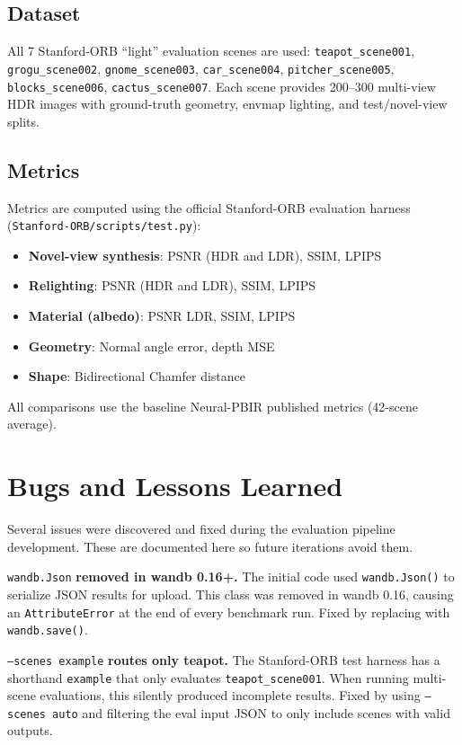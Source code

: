 \subsection{Dataset}

All 7 Stanford-ORB ``light'' evaluation scenes are used:
\texttt{teapot\_scene001}, \texttt{grogu\_scene002}, \texttt{gnome\_scene003},
\texttt{car\_scene004}, \texttt{pitcher\_scene005}, \texttt{blocks\_scene006},
\texttt{cactus\_scene007}. Each scene provides 200--300 multi-view HDR images
with ground-truth geometry, envmap lighting, and test/novel-view splits.

\subsection{Metrics}

Metrics are computed using the official Stanford-ORB evaluation harness
(\texttt{Stanford-ORB/scripts/test.py}):

\begin{itemize}
    \item \textbf{Novel-view synthesis}: PSNR (HDR and LDR), SSIM, LPIPS
    \item \textbf{Relighting}: PSNR (HDR and LDR), SSIM, LPIPS
    \item \textbf{Material (albedo)}: PSNR LDR, SSIM, LPIPS
    \item \textbf{Geometry}: Normal angle error, depth MSE
    \item \textbf{Shape}: Bidirectional Chamfer distance
\end{itemize}

All comparisons use the baseline Neural-PBIR published metrics (42-scene average).

\section{Bugs and Lessons Learned}

Several issues were discovered and fixed during the evaluation pipeline
development. These are documented here so future iterations avoid them.

\texttt{wandb.Json} \textbf{removed in wandb 0.16+.}
The initial code used \texttt{wandb.Json()} to serialize JSON results for
upload. This class was removed in wandb 0.16, causing an
\texttt{AttributeError} at the end of every benchmark run. Fixed by replacing
with \texttt{wandb.save()}.

\texttt{--scenes example} \textbf{routes only teapot.}
The Stanford-ORB test harness has a shorthand \texttt{example} that only
evaluates \texttt{teapot\_scene001}. When running multi-scene evaluations,
this silently produced incomplete results. Fixed by using \texttt{--scenes auto}
and filtering the eval input JSON to only include scenes with valid outputs.

